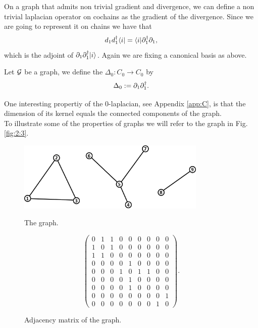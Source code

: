 \documentclass[../2.tex]{subfiles}
\begin{document}
    On a graph that admits non trivial gradient and divergence,
    we can define a non trivial laplacian operator on cochains as the gradient of the divergence.
    Since we are going to represent it on chains we have that
    \[ d_1d_1^\dagger \langle i | = \langle i |\partial_1^\dagger\partial_1, \]
    which is the adjoint of $\partial_1\partial_1^\dagger| i \rangle$.
    Again we are fixing a canonical basis as above.

    \begin{defn}
        Let $\mathcal{G}$ be a graph, we define the  $\Delta_0 : C_0 \to C_0$ by 
        \[ \Delta_0 := \partial_1 \partial^\dagger_1.\]
    \end{defn}

    One interesting propertiy of the $0$-laplacian, see Appendix \ref{app:C}, is that the dimension of its kernel equals the connected components of the graph.\\
    To illustrate some of the properties of graphs we will refer to the graph in Fig. \ref{fig:2:3}.

    \begin{figure}[H]
        \begin{minipage}{.5\textwidth}
            \centering
            \includegraphics[width=9cm]{sections/2/graphex}
            \caption{The graph.}
            \label{fig:2:3}
        \end{minipage}
        \begin{minipage}{.5\textwidth}
            \centering
            \[\begin{pmatrix}
                0 & 1 & 1 & 0 & 0 & 0 & 0 & 0 & 0 \\
                1 & 0 & 1 & 0 & 0 & 0 & 0 & 0 & 0 \\
                1 & 1 & 0 & 0 & 0 & 0 & 0 & 0 & 0 \\
                0 & 0 & 0 & 0 & 1 & 0 & 0 & 0 & 0 \\
                0 & 0 & 0 & 1 & 0 & 1 & 1 & 0 & 0 \\
                0 & 0 & 0 & 0 & 1 & 0 & 0 & 0 & 0 \\
                0 & 0 & 0 & 0 & 1 & 0 & 0 & 0 & 0 \\
                0 & 0 & 0 & 0 & 0 & 0 & 0 & 0 & 1 \\
                0 & 0 & 0 & 0 & 0 & 0 & 0 & 1 & 0
            \end{pmatrix}. \]
            \caption{Adjacency matrix of the graph.}
            \label{fig:2:4}
        \end{minipage}
    \end{figure}
\end{document}
